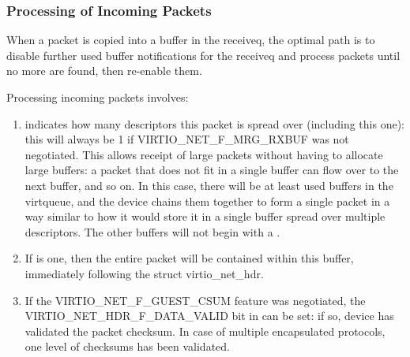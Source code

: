 \subsubsection{Processing of Incoming Packets}\label{sec:Device Types / Network Device / Device Operation / Processing of Incoming Packets}
\label{sec:Device Types / Network Device / Device Operation / Processing of Packets}%

When a packet is copied into a buffer in the receiveq, the
optimal path is to disable further used buffer notifications for the
receiveq and process packets until no more are found, then re-enable
them.

Processing incoming packets involves:

\begin{enumerate}
\item {} indicates how many descriptors
  this packet is spread over (including this one): this will
  always be 1 if VIRTIO_NET_F_MRG_RXBUF was not negotiated.
  This allows receipt of large packets without having to allocate large
  buffers: a packet that does not fit in a single buffer can flow
  over to the next buffer, and so on. In this case, there will be
  at least  used buffers in the virtqueue, and the device
  chains them together to form a single packet in a way similar to
  how it would store it in a single buffer spread over multiple
  descriptors.
  The other buffers will not begin with a .

\item If
   is one, then the entire packet will be
  contained within this buffer, immediately following the struct
  virtio_net_hdr.
\item If the VIRTIO_NET_F_GUEST_CSUM feature was negotiated, the
  VIRTIO_NET_HDR_F_DATA_VALID bit in  can be
  set: if so, device has validated the packet checksum.
  In case of multiple encapsulated protocols, one level of checksums
  has been validated.
\end{enumerate}

